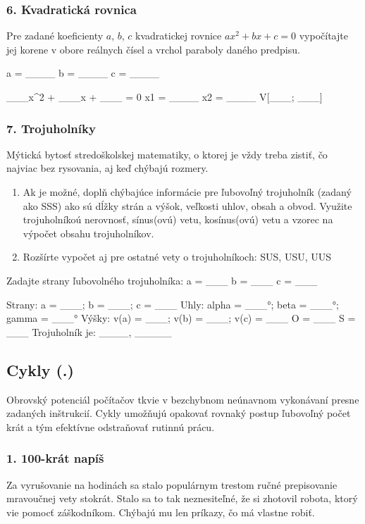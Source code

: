 \subsubsection*{6. Kvadratická rovnica}
Pre zadané koeficienty $a$, $b$, $c$ kvadratickej rovnice $ax^2 + bx + c = 0$  vypočítajte jej korene v obore reálnych čísel a vrchol paraboly daného predpisu.

\begin{code}
a = ____
b = ____
c = ____

___x^2 + ___x + ___ = 0
x1 = ____
x2 = ____
V[___; ___]
\end{code}

\subsubsection*{7. Trojuholníky}
Mýtická bytosť stredoškolskej matematiky, o ktorej je vždy treba zistiť, čo najviac bez rysovania, aj keď chýbajú rozmery.

\begin{enumerate}[label=\alph*)]
\item Ak je možné, doplň chýbajúce informácie pre ľubovoľný trojuholník (zadaný ako SSS) ako sú dĺžky strán a výšok, veľkosti uhlov, obsah a obvod. Využite trojuholníkoú nerovnosť, sínus(ovú) vetu, kosínus(ovú) vetu a vzorec na výpočet obsahu trojuholníkov.
\item Rozšírte vypočet aj pre ostatné vety o trojuholníkoch: SUS, USU, UUS
\end{enumerate}

\begin{code}
Zadajte strany ľubovolného trojuholníka:
a = ___
b = ___
c = ___

Strany: a = ___; b = ___; c = ___
Uhly: alpha = ___°; beta = ___°; gamma = ___°
Výšky: v(a) = ___; v(b) = ___; v(c) = ___
O = ___
S = ___
Trojuholník je: ____, _____
\end{code}


\subsection{Cykly (.)}
Obrovský potenciál počítačov tkvie v bezchybnom neúnavnom vykonávaní presne zadaných inštrukcií. Cykly umožňujú opakovať rovnaký postup ľubovoľný počet krát a tým efektívne odstraňovať rutinnú prácu.


\subsubsection*{1. 100-krát napíš}
Za vyrušovanie na hodinách sa stalo populárnym trestom ručné prepisovanie mravoučnej vety stokrát. Stalo sa to tak neznesiteľné, že si zhotovil robota, ktorý vie pomocť záškodníkom. Chýbajú mu len príkazy, čo má vlastne robiť.

